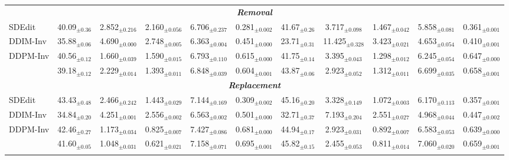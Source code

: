 \begin{table}[t]
{\begin{tabular}{lcccccccccc}
\midrule

\multicolumn{11}{c}{\textbf{\textit{Removal}}} \\
\hdashline
\rule{0pt}{2ex}SDEdit & 40.09$_{\pm 0.36}$ & 2.852$_{\pm 0.216}$ & 2.160$_{\pm 0.056}$ & 6.706$_{\pm 0.237}$ & 0.281$_{\pm 0.002}$ & 41.67$_{\pm 0.26}$ & 3.717$_{\pm 0.098}$ & 1.467$_{\pm 0.042}$ & 5.858$_{\pm 0.081}$ & 0.361$_{\pm 0.001}$ \\
DDIM-Inv & 35.88$_{\pm 0.06}$ & 4.690$_{\pm 0.000}$ & 2.748$_{\pm 0.005}$ & 6.363$_{\pm 0.004}$ & 0.451$_{\pm 0.000}$ & 23.71$_{\pm 0.31}$ & 11.425$_{\pm 0.328}$ & 3.423$_{\pm 0.021}$ & 4.653$_{\pm 0.054}$ & 0.410$_{\pm 0.001}$ \\
DDPM-Inv & 40.56$_{\pm 0.12}$ & 1.660$_{\pm 0.039}$ & 1.590$_{\pm 0.015}$ & 6.793$_{\pm 0.110}$ & 0.615$_{\pm 0.000}$ & 41.75$_{\pm 0.14}$ & 3.395$_{\pm 0.043}$ & 1.298$_{\pm 0.012}$ & 6.245$_{\pm 0.054}$ & 0.647$_{\pm 0.000}$ \\
\ourmethod{} & 39.18$_{\pm 0.12}$ & 2.229$_{\pm 0.014}$ & 1.393$_{\pm 0.011}$ & 6.848$_{\pm 0.039}$ & 0.604$_{\pm 0.001}$ & 43.87$_{\pm 0.06}$ & 2.923$_{\pm 0.052}$ & 1.312$_{\pm 0.011}$ & 6.699$_{\pm 0.035}$ & 0.658$_{\pm 0.001}$ \\

\midrule

\multicolumn{11}{c}{\textbf{\textit{Replacement}}} \\
\hdashline
\rule{0pt}{2ex}SDEdit & 43.43$_{\pm 0.48}$ & 2.466$_{\pm 0.242}$ & 1.443$_{\pm 0.029}$ & 7.144$_{\pm 0.169}$ & 0.309$_{\pm 0.002}$ & 45.16$_{\pm 0.20}$ & 3.328$_{\pm 0.149}$ & 1.072$_{\pm 0.003}$ & 6.170$_{\pm 0.113}$ & 0.357$_{\pm 0.001}$ \\
DDIM-Inv & 34.84$_{\pm 0.20}$ & 4.251$_{\pm 0.001}$ & 2.556$_{\pm 0.002}$ & 6.563$_{\pm 0.002}$ & 0.501$_{\pm 0.000}$ & 32.71$_{\pm 0.37}$ & 7.193$_{\pm 0.204}$ & 2.551$_{\pm 0.027}$ & 4.968$_{\pm 0.044}$ & 0.447$_{\pm 0.002}$ \\
DDPM-Inv & 42.46$_{\pm 0.27}$ & 1.173$_{\pm 0.034}$ & 0.825$_{\pm 0.007}$ & 7.427$_{\pm 0.086}$ & 0.681$_{\pm 0.000}$ & 44.94$_{\pm 0.17}$ & 2.923$_{\pm 0.031}$ & 0.892$_{\pm 0.007}$ & 6.583$_{\pm 0.053}$ & 0.639$_{\pm 0.000}$ \\
\ourmethod{} & 41.60$_{\pm 0.05}$ & 1.048$_{\pm 0.031}$ & 0.621$_{\pm 0.021}$ & 7.158$_{\pm 0.071}$ & 0.695$_{\pm 0.001}$ & 45.82$_{\pm 0.15}$ & 2.455$_{\pm 0.053}$ & 0.811$_{\pm 0.014}$ & 7.060$_{\pm 0.020}$ & 0.659$_{\pm 0.001}$ \\

\midrule
\rowcolor{gray!20}
\multicolumn{11}{c}{\textbf{Music Editing Benchmark}} \\
\midrule


\end{tabular}}
\end{table}
